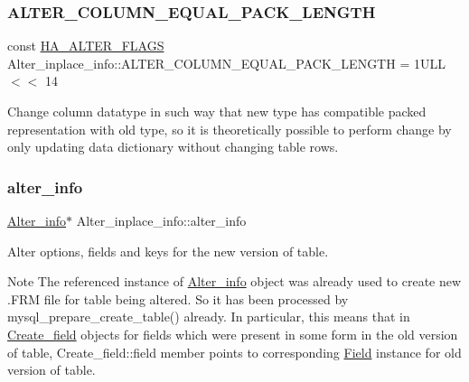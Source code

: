 \subsubsection{\texorpdfstring{A\+L\+T\+E\+R\+\_\+\+C\+O\+L\+U\+M\+N\+\_\+\+E\+Q\+U\+A\+L\+\_\+\+P\+A\+C\+K\+\_\+\+L\+E\+N\+G\+TH}{ALTER\_COLUMN\_EQUAL\_PACK\_LENGTH}}
{\footnotesize\ttfamily const \mbox{\hyperlink{classAlter__inplace__info_a45258f36b4942b5cabee7239463daaca}{H\+A\+\_\+\+A\+L\+T\+E\+R\+\_\+\+F\+L\+A\+GS}} Alter\+\_\+inplace\+\_\+info\+::\+A\+L\+T\+E\+R\+\_\+\+C\+O\+L\+U\+M\+N\+\_\+\+E\+Q\+U\+A\+L\+\_\+\+P\+A\+C\+K\+\_\+\+L\+E\+N\+G\+TH = 1\+U\+L\+L $<$$<$ 14\hspace{0.3cm}{\ttfamily [static]}}

Change column datatype in such way that new type has compatible packed representation with old type, so it is theoretically possible to perform change by only updating data dictionary without changing table rows. \mbox{\label{classAlter__inplace__info_a025d7b7318cc152b91c63e89e9dbd2c8}} 
\subsubsection{\texorpdfstring{alter\+\_\+info}{alter\_info}}
{\footnotesize\ttfamily \mbox{\hyperlink{classAlter__info}{Alter\+\_\+info}}$\ast$ Alter\+\_\+inplace\+\_\+info\+::alter\+\_\+info}

Alter options, fields and keys for the new version of table.

\begin{DoxyNote}{Note}
The referenced instance of \mbox{\hyperlink{classAlter__info}{Alter\+\_\+info}} object was already used to create new .F\+RM file for table being altered. So it has been processed by mysql\+\_\+prepare\+\_\+create\+\_\+table() already. In particular, this means that in \mbox{\hyperlink{classCreate__field}{Create\+\_\+field}} objects for fields which were present in some form in the old version of table, Create\+\_\+field\+::field member points to corresponding \mbox{\hyperlink{classField}{Field}} instance for old version of table. 
\end{DoxyNote}
\mbox{\label{classAlter__inplace__info_a98ccd138fdc5742b611b7328fc1c77a4}} 
